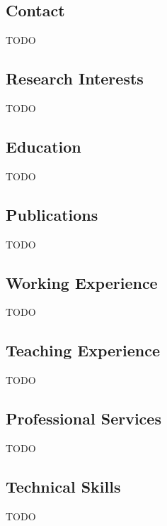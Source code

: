\usepackage{tabularx}
\usepackage{hyperref}
\usepackage{listings}

\subsection{Contact}
\label{sec:contact}
TODO


\subsection{Research Interests}
\label{sec:research-interests}
TODO

\subsection{Education}
\label{sec:education}
TODO

\subsection{Publications}
\label{sec:publications}
TODO

\subsection{Working Experience}
\label{sec:working-experience}
TODO

\subsection{Teaching Experience}
\label{sec:teaching-experience}
TODO

\subsection{Professional Services}
\label{sec:services}
TODO

\subsection{Technical Skills}
\label{sec:skills}
TODO
